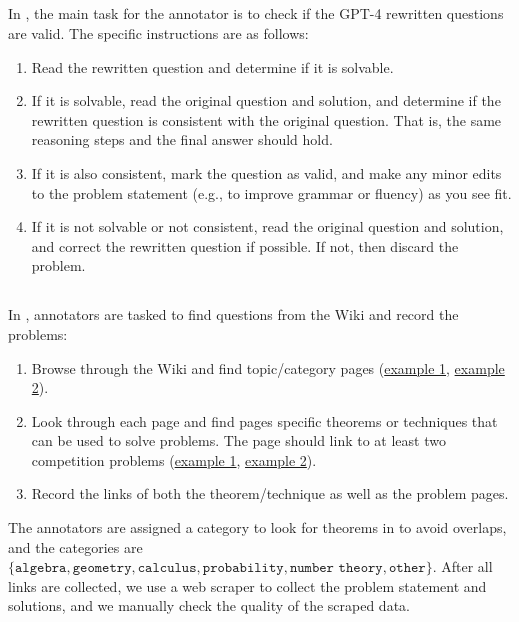 \subsection{\theorem}
In \theorem, the main task for the annotator is to check if the GPT-4 rewritten questions are valid.
The specific instructions are as follows:
\begin{enumerate}
    \item Read the rewritten question and determine if it is solvable.
    \item If it is solvable, read the original question and solution, and determine if the rewritten question is consistent with the original question. That is, the same reasoning steps and the final answer should hold.
    \item If it is also consistent, mark the question as valid, and make any minor edits to the problem statement (e.g., to improve grammar or fluency) as you see fit. 
    \item If it is not solvable or not consistent, read the original question and solution, and correct the rewritten question if possible. If not, then discard the problem.
\end{enumerate}

\subsection{\aops}
In \aops, annotators are tasked to find questions from the \aops Wiki and record the problems:
\begin{enumerate}
    \item Browse through the \aops Wiki and find topic/category pages (\href{https://artofproblemsolving.com/wiki/index.php/Category:Theorems}{example 1}, \href{https://artofproblemsolving.com/wiki/index.php/Inequality}{example 2}).
    \item Look through each page and find pages specific theorems or techniques that can be used to solve problems. The page should link to at least two competition problems (\href{https://artofproblemsolving.com/wiki/index.php/Newton%27s_Sums}{example 1}, \href{https://artofproblemsolving.com/wiki/index.php/Vieta%27s_formulas}{example 2}). 
    \item Record the links of both the theorem/technique as well as the problem pages. 
\end{enumerate}
The annotators are assigned a category to look for theorems in to avoid overlaps, and the categories are $\{\texttt{algebra}, \texttt{geometry}, \texttt{calculus}, \texttt{probability}, \texttt{number theory}, \texttt{other}\}$.
After all links are collected, we use a web scraper to collect the problem statement and solutions, and we manually check the quality of the scraped data.

